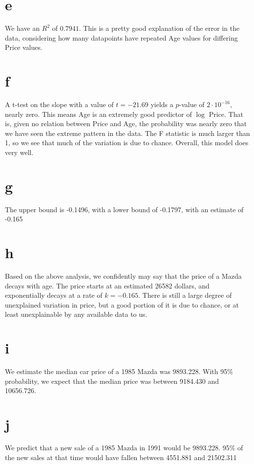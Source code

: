 \documentclass[a4paper]{article}
\begin{document}
\section*{e}%
\label{sec:e}
We have an \(R^2\) of \(0.7941\). This is a pretty good explanation of the error in the data, considering how many datapoints have repeated Age values for differing Price values.

\section*{f}%
\label{sec:f}
A t-test on the slope with a value of \(t=-21.69\) yields a \(p\)-value of \(2 \cdot 10^{-16}\), nearly zero. This means Age is an extremely good predictor of \(\log\) Price. That is, given no relation between Price and Age, the probability was nearly zero that we have seen the extreme pattern in the data. The F statistic is much larger than 1, so we see that much of the variation is due to chance. Overall, this model does very well.

\section*{g}%
\label{sec:g}
The upper bound is -0.1496, with a lower bound of -0.1797, with an estimate of -0.165

\section*{h}%
\label{sec:h}
Based on the above analysis, we confidently may say that the price of a Mazda decays with age. The price starts at an estimated 26582 dollars, and exponentially decays at a rate of \(k=-0.165\). There is still a large degree of unexplained variation in price, but a good portion of it is due to chance, or at least unexplainable by any available data to us.

\section*{i}%
\label{sec:i}

We estimate the median car price of a 1985 Mazda was 9893.228. With 95\% probability, we expect that the median price was between 9184.430 and 10656.726.

\section*{j}%
\label{sec:j}

We predict that a new sale of a 1985 Mazda in 1991 would be 9893.228. 95\% of the new sales at that time would have fallen between 4551.881 and 21502.311
\end{document}
